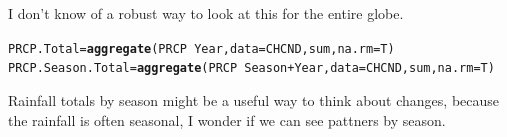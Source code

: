 \documentclass{article}\usepackage[]{graphicx}\usepackage[]{color}
\makeatletter
\newcommand{\hlopt}[1]{\textcolor[rgb]{0,0,0}{#1}}%
\newcommand{\hlstd}[1]{\textcolor[rgb]{0.345,0.345,0.345}{#1}}%
\newcommand{\hlkwb}[1]{\textcolor[rgb]{0.69,0.353,0.396}{#1}}%
\newcommand{\hlkwc}[1]{\textcolor[rgb]{0.333,0.667,0.333}{#1}}%
\newcommand{\hlkwd}[1]{\textcolor[rgb]{0.737,0.353,0.396}{\textbf{#1}}}%
\newenvironment{kframe}{%
 \def\at@end@of@kframe{}%
 \ifinner\ifhmode%
  \def\at@end@of@kframe{\end{minipage}}%
  \begin{minipage}{\columnwidth}%
 \fi\fi%
 \def\FrameCommand##1{\hskip\@totalleftmargin \hskip-\fboxsep
 \colorbox{shadecolor}{##1}\hskip-\fboxsep
     \hskip-\linewidth \hskip-\@totalleftmargin \hskip\columnwidth}%
 \MakeFramed {\advance\hsize-\width
   \@totalleftmargin\z@ \linewidth\hsize
   \@setminipage}}%
 {\par\unskip\endMakeFramed%
 \at@end@of@kframe}
\newenvironment{knitrout}{}{} %
\makeatother
\begin{document}
I don't know of a robust way to look at this for the entire globe. 

\begin{knitrout}
\color{fgcolor}\begin{kframe}
\begin{alltt}
\hlstd{PRCP.Total} \hlkwb{=} \hlkwd{aggregate}\hlstd{(PRCP}\hlopt{~}\hlstd{Year,} \hlkwc{data}\hlstd{=CHCND, sum,} \hlkwc{na.rm}\hlstd{=T)}
\hlstd{PRCP.Season.Total} \hlkwb{=} \hlkwd{aggregate}\hlstd{(PRCP}\hlopt{~}\hlstd{Season}\hlopt{+}\hlstd{Year,} \hlkwc{data}\hlstd{=CHCND, sum,} \hlkwc{na.rm}\hlstd{=T)}
\end{alltt}
\end{kframe}
\end{knitrout}

Rainfall totals by season might be a useful way to think about changes, because the rainfall is often seasonal, I wonder if we can see pattners by season. 
\end{document}
